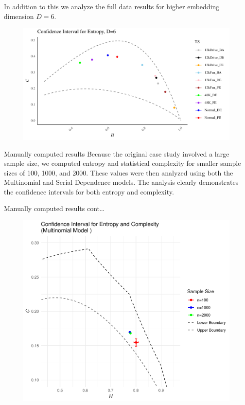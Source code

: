 \documentclass{beamer}
\begin{document}
\begin{frame}
	In addition to this we analyze the full data results for higher embedding dimension $D=6$.
		\begin{figure}[hbt]
		\centering
		\includegraphics[width=0.8 \textwidth]{Confidence Interval}
		\label{fig:EntopyComplexity Plane D=6}
	\end{figure}
\end{frame}

\begin{frame}{Manually computed results}
Because the original case study involved a large sample size, we computed entropy and statistical complexity for smaller sample sizes of 100, 1000, and 2000. These values were then analyzed using both the Multinomial and Serial Dependence models. The analysis clearly demonstrates the confidence intervals for both entropy and complexity.	
\end{frame}

\begin{frame}{Manually computed results cont\dots}
	\begin{figure}[hbt]
		\centering
		\includegraphics[width=0.7 \textwidth]{CI for Multinomial model}
	\end{figure}
\end{frame}
\end{document}
